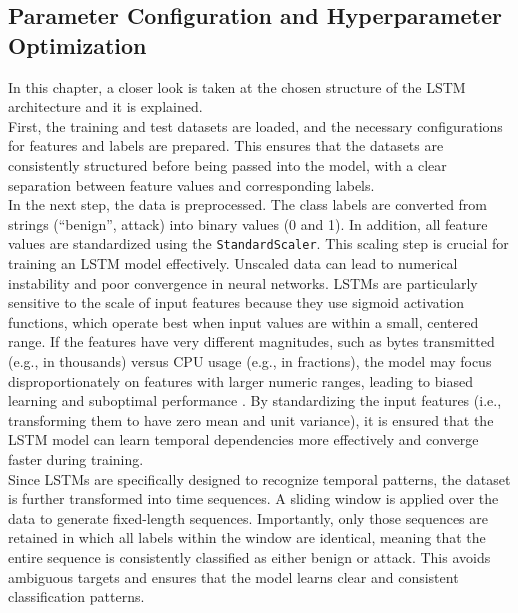 \subsection{Parameter Configuration and Hyperparameter Optimization}
In this chapter, a closer look is taken at the chosen structure of the LSTM architecture and it is explained.\\

First, the training and test datasets are loaded, and the necessary configurations for features and labels are prepared. This ensures that the datasets are consistently structured before being passed into the model, with a clear separation between feature values and corresponding labels.\\

In the next step, the data is preprocessed. The class labels are converted from strings (``benign'', attack) into binary values (0 and 1). In addition, all feature values are standardized using the \texttt{StandardScaler}. This scaling step is crucial for training an LSTM model effectively. Unscaled data can lead to numerical instability and poor convergence in neural networks. LSTMs are particularly sensitive to the scale of input features because they use sigmoid activation functions, which operate best when input values are within a small, centered range. If the features have very different magnitudes, such as bytes transmitted (e.g., in thousands) versus CPU usage (e.g., in fractions), the model may focus disproportionately on features with larger numeric ranges, leading to biased learning and suboptimal performance \cite{input_scaling_important}. By standardizing the input features (i.e., transforming them to have zero mean and unit variance), it is ensured that the LSTM model can learn temporal dependencies more effectively and converge faster during training.\\

Since LSTMs are specifically designed to recognize temporal patterns, the dataset is further transformed into time sequences. A sliding window is applied over the data to generate fixed-length sequences. Importantly, only those sequences are retained in which all labels within the window are identical, meaning that the entire sequence is consistently classified as either benign or attack. This avoids ambiguous targets and ensures that the model learns clear and consistent classification patterns.\\

